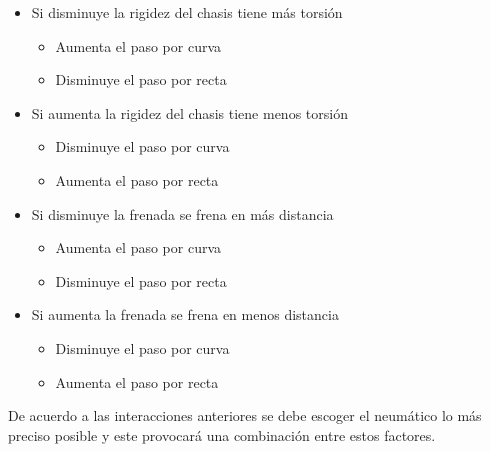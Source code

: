 \begin{itemize}
		\item Si disminuye la rigidez del chasis tiene más torsión
		\begin{itemize}
			\item Aumenta el paso por curva
			\item Disminuye el paso por recta
		\end{itemize}
		\item Si aumenta la rigidez del chasis tiene menos torsión
		\begin{itemize}
			\item Disminuye el paso por curva
			\item Aumenta el paso por recta
		\end{itemize}
	
		\item Si disminuye la frenada se frena en más distancia
		\begin{itemize}
			\item Aumenta el paso por curva
			\item Disminuye el paso por recta
		\end{itemize}
		\item Si aumenta la frenada se frena en menos distancia
		\begin{itemize}
			\item Disminuye el paso por curva
			\item Aumenta el paso por recta
		\end{itemize}
	\end{itemize}
	De acuerdo a las interacciones anteriores se debe escoger el neumático lo más preciso posible y este provocará una combinación entre estos factores.